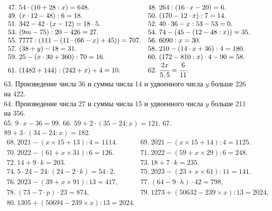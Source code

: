 \documentclass[12pt]{article}
\begin{document}
$\begin{array}{ll}
47.\ 54\cdot(10+28:x)=648.&
48.\ 264:(16\cdot x-20)=6.\\
49.\ (x\cdot12-48):6=18.&
50.\ (170-12\cdot x):7=14.\\
51.\ 342-42\cdot(x-12)=18\cdot5.&
52.\ 40\cdot36-x:53-53=0.\\
53.\ (9m-75):20-426=27.&
54.\ 74-(45-(12-48:x))=35.\\
55.\ 7777:(111-(11\cdot(66-x)+45))=707.&
56.\ 6090:x=30.\\
57.\ (38+y)-18=31.&
58.\ 210-(14\cdot x+36):4=180.\\
59.\ 25-(x\cdot30+360):70=16.&
60.\ (172-810:x)\cdot4-90=58.\\
61.\ (1482+144):(242+x)+4=10.&
62.\ \cfrac{2x}{5,5}=\cfrac{6}{11}.
\end{array}$\\
63. Произведение числа 36 и суммы числа 14 и удвоенного числа $y$ больше 226 на 422.\\
64. Произведение числа 27 и суммы числа 15 и удвоенного числа $y$ больше 211 на 356.\\
65. $9\cdot x -36=99.$ 66. $59+2\cdot(35-24:x)=121.$ 67. $89+3\cdot(34-24:x)=182.$\\
$\begin{array}{ll}
68.\ 2021-(x\times15+13):4=1114.& 69.\ 2021-(x\times15+14):4=1125.\\
70.\ 2022-(61+x\times31):6=126.& 71.\ 2022-(59+x\times29):6=248.\\
72.\ 14+9\cdot k=203.& 73.\ 18+7\cdot k=235.\\
74.\ 5\cdot24-24:(24-2\cdot k)=54\cdot2.&
75.\ 2023 - (23 + x \times 61) : 11 = 141.\\
76.\ 2023 - (39 + x \times 91) : 13 = 417,&
77.\ (64 - 9 \cdot h) \cdot 42 = 798,\\
78.\ (73 - 7 \cdot p) \cdot 23 = 874,&
79.\ 1273+(50632-239\times x):13=2024,\\
80.\ 1305+(50694-239\times x):13=2024.
\end{array}$
\newpage
\end{document}
